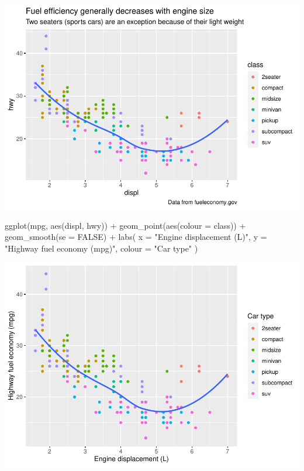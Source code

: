 \documentclass[
]{article}
\newenvironment{Shaded}{\begin{snugshade}}{\end{snugshade}}
\newcommand{\AttributeTok}[1]{\textcolor[rgb]{0.77,0.63,0.00}{#1}}
\newcommand{\ConstantTok}[1]{\textcolor[rgb]{0.00,0.00,0.00}{#1}}
\newcommand{\FunctionTok}[1]{\textcolor[rgb]{0.00,0.00,0.00}{#1}}
\newcommand{\NormalTok}[1]{#1}
\newcommand{\SpecialCharTok}[1]{\textcolor[rgb]{0.00,0.00,0.00}{#1}}
\newcommand{\StringTok}[1]{\textcolor[rgb]{0.31,0.60,0.02}{#1}}
\begin{document}
\includegraphics{Journal_files/figure-latex/unnamed-chunk-57-2.pdf}

\begin{Shaded}
\begin{Highlighting}[]
\FunctionTok{ggplot}\NormalTok{(mpg, }\FunctionTok{aes}\NormalTok{(displ, hwy)) }\SpecialCharTok{+}
  \FunctionTok{geom\_point}\NormalTok{(}\FunctionTok{aes}\NormalTok{(}\AttributeTok{colour =}\NormalTok{ class)) }\SpecialCharTok{+}
  \FunctionTok{geom\_smooth}\NormalTok{(}\AttributeTok{se =} \ConstantTok{FALSE}\NormalTok{) }\SpecialCharTok{+}
  \FunctionTok{labs}\NormalTok{(}
    \AttributeTok{x =} \StringTok{"Engine displacement (L)"}\NormalTok{,}
    \AttributeTok{y =} \StringTok{"Highway fuel economy (mpg)"}\NormalTok{,}
    \AttributeTok{colour =} \StringTok{"Car type"}
\NormalTok{  )}
\end{Highlighting}
\end{Shaded}

\includegraphics{Journal_files/figure-latex/unnamed-chunk-57-3.pdf}
\end{document}
